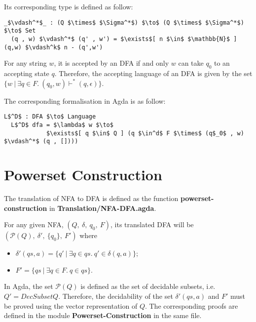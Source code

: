 \par Its corresponding type is defined as follow: 
\begin{lstlisting}[mathescape=true,xleftmargin=.1\textwidth]
  _$\vdash^*$_ : (Q $\times$ $\Sigma^*$) $\to$ (Q $\times$ $\Sigma^*$) $\to$ Set
  (q , w) $\vdash^*$ (q' , w') = $\exists$[ n $\in$ $\mathbb{N}$ ] (q,w) $\vdash^k$ n - (q',w')
\end{lstlisting}

\begin{defn}
\noindent For any string \(w\), it is accepted by an DFA
if and only \(w\) can take \(q_0\) to an accepting state \(q\). Therefore, the
accepting language of an DFA is given by the set \(\{w\ |\ \exists q\in F.\ (q_0,w) \vdash^* (q,\epsilon)\}\). 
\end{defn}

\par The corresponding formalisation in Agda is as follow: 
\begin{lstlisting}[mathescape=true,xleftmargin=.1\textwidth]
  L$^D$ : DFA $\to$ Language
  L$^D$ dfa = $\lambda$ w $\to$ 
            $\exists$[ q $\in$ Q ] (q $\in^d$ F $\times$ (q$_0$ , w) $\vdash^*$ (q , [])))
\end{lstlisting} 


\section{Powerset Construction}
\par The translation of NFA to DFA is defined as the function
\textbf{powerset-construction} in \textbf{Translation/NFA-DFA.agda}. 

\begin{defn}
\label{defn:powerset}
\noindent For any given NFA, \((Q,\ \delta,\ q_0,\ F)\), its
translated DFA will be \((\mathcal P \left({Q}\right),\ \delta',\ \{q_0\},\ F')\) where
\begin{itemize}[nolistsep]
  \item \(\delta'(qs,a) = \{q'\ |\ \exists q\in qs.\ q' \in \delta (q,a)\}\);
  \item \(F' = \{qs\ |\ \exists q\in F.\ q \in qs\}\). 
\end{itemize}
\end{defn}

\par In Agda, the set \(\mathcal P \left({Q}\right)\) is defined as
the set of decidable subsets, i.e. \(Q' = DecSubset Q\). Therefore,
the decidability of the set \(\delta'(qs,a)\) and \(F'\) must be
proved using the vector representation of \(Q\). The corresponding
proofs are defined in the module \textbf{Powerset-Construction} in the
same file. 

